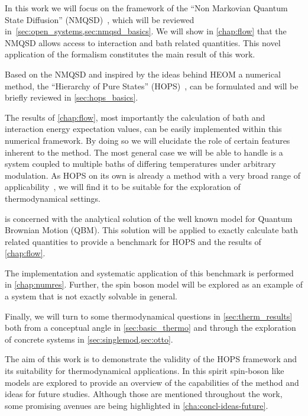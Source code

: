In this work we will focus on the framework of the ``Non Markovian
Quantum State Diffusion'' (NMQSD)~\cite{Diosi1998Mar}, which will be
reviewed in~\cref{sec:open_systems,sec:nmqsd_basics}. We will show in
\cref{chap:flow} that the NMQSD allows access to interaction and bath
related quantities. This novel application of the formalism
constitutes the main result of this work.

Based on the NMQSD and inspired by the ideas behind HEOM a numerical
method, the ``Hierarchy of Pure States''
(HOPS)~\cite{RichardDiss,Hartmann2017Dec}, can be formulated and will
be briefly reviewed in \cref{sec:hops_basics}.

The results of \cref{chap:flow}, most importantly the calculation of
bath and interaction energy expectation values, can be easily
implemented within this numerical framework. By doing so we will
elucidate the role of certain features inherent to the method. The
most general case we will be able to handle is a system coupled to
multiple baths of differing temperatures under arbitrary
modulation. As HOPS on its own is already a method with a very broad
range of applicability~\cite{RichardDiss}, we will find it to be
suitable for the exploration of thermodynamical settings.

 is concerned with the analytical solution of the
well known model for Quantum Brownian Motion (QBM). This solution will
be applied to exactly calculate bath related quantities to provide a
benchmark for HOPS and the results of \cref{chap:flow}.

The implementation and systematic application of this benchmark is
performed in \cref{chap:numres}. Further, the spin boson model will be
explored as an example of a system that is not exactly solvable in
general.

Finally, we will turn to some thermodynamical questions in
\cref{sec:therm_results} both from a conceptual angle in
\cref{sec:basic_thermo} and through the exploration of concrete
systems in \cref{sec:singlemod,sec:otto}.

The aim of this work is to demonstrate the validity of the HOPS
framework and its suitability for thermodynamical applications. In
this spirit spin-boson like models are explored to provide an overview
of the capabilities of the method and ideas for future
studies. Although those are mentioned throughout the work, some
promising avenues are being highlighted in
\cref{cha:concl-ideas-future}.

